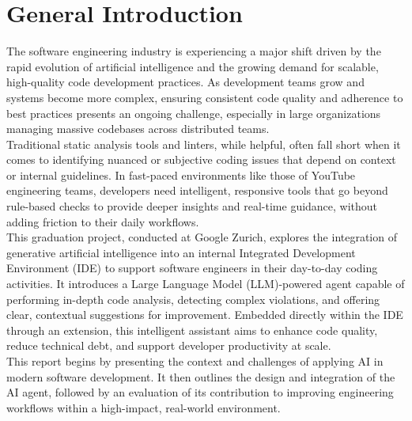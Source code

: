 \chapter*{General Introduction}

\begin{spacing}{1.2}

The software engineering industry is experiencing a major shift driven by the rapid evolution of artificial intelligence and the growing demand for scalable, high-quality code development practices. As development teams grow and systems become more complex, ensuring consistent code quality and adherence to best practices presents an ongoing challenge, especially in large organizations managing massive codebases across distributed teams.\\

Traditional static analysis tools and linters, while helpful, often fall short when it comes to identifying nuanced or subjective coding issues that depend on context or internal guidelines. In fast-paced environments like those of YouTube engineering teams, developers need intelligent, responsive tools that go beyond rule-based checks to provide deeper insights and real-time guidance, without adding friction to their daily workflows.\\

This graduation project, conducted at Google Zurich, explores the integration of generative artificial intelligence into an internal Integrated Development Environment (IDE) to support software engineers in their day-to-day coding activities. It introduces a Large Language Model (LLM)-powered agent capable of performing in-depth code analysis, detecting complex violations, and offering clear, contextual suggestions for improvement. Embedded directly within the IDE through an extension, this intelligent assistant aims to enhance code quality, reduce technical debt, and support developer productivity at scale.\\

This report begins by presenting the context and challenges of applying AI in modern software development. It then outlines the design and integration of the AI agent, followed by an evaluation of its contribution to improving engineering workflows within a high-impact, real-world environment.




\end{spacing}


